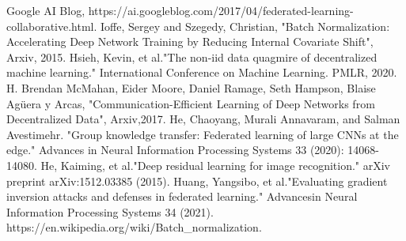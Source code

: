 \documentclass[conference]{IEEEtran}
\begin{document}
\newpage
\begin{thebibliography}{00}
 Google AI Blog, https://ai.googleblog.com/2017/04/federated-learning-collaborative.html.
 Ioffe, Sergey and Szegedy, Christian, "Batch Normalization: Accelerating Deep Network Training by Reducing Internal Covariate Shift", Arxiv, 2015.
 Hsieh, Kevin, et al."The non-iid data quagmire of decentralized machine learning."
International Conference on Machine Learning. PMLR, 2020.
 H. Brendan McMahan, Eider Moore, Daniel Ramage, Seth Hampson, Blaise Agüera y Arcas, "Communication-Efficient Learning of Deep Networks from Decentralized Data", Arxiv,2017.
He, Chaoyang, Murali Annavaram, and Salman Avestimehr. "Group knowledge transfer:
Federated learning of large CNNs at the edge." Advances in Neural Information Processing
Systems 33 (2020): 14068-14080.
 He, Kaiming, et al."Deep residual learning for image recognition." arXiv preprint
arXiv:1512.03385 (2015).
 Huang, Yangsibo, et al."Evaluating gradient inversion attacks and defenses in federated learning." Advancesin Neural Information Processing Systems 34 (2021).
 https://en.wikipedia.org/wiki/Batch\_normalization.


\end{thebibliography}

\appendices
\end{document}
